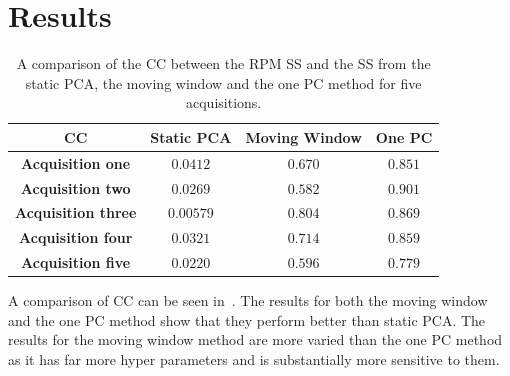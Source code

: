 \section{Results} \label{sec:results}
    \begin{table}
        \vspace{-0.5cm}
        \centering
        \captionsetup{singlelinecheck=false, justification=centering}
        \caption{A comparison of the \gls{CC} between the \gls{RPM} \gls{SS} and the \gls{SS} from the static \gls{PCA}, the moving window and the one \gls{PC} method for five acquisitions.}
        
        \resizebox*{1.0\linewidth}{!}
        {
            \begin{tabular}{||c|ccc||}
                \hline
                \textbf{\gls{CC}} & \textbf{Static \gls{PCA}} & \textbf{Moving Window} & \textbf{One \gls{PC}} \\
                \hline
                \textbf{Acquisition one}    & $0.0412$  & $0.670$ & $0.851$ \\
                \textbf{Acquisition two}    & $0.0269$  & $0.582$ & $0.901$ \\
                \textbf{Acquisition three}  & $0.00579$ & $0.804$ & $0.869$ \\
                \textbf{Acquisition four}   & $0.0321$  & $0.714$ & $0.859$ \\
                \textbf{Acquisition five}   & $0.0220$  & $0.596$ & $0.779$ \\
                \hline
            \end{tabular}
        }
        \label{tab:cross_correlation}
        \vspace{-0.0cm}
    \end{table}
    
    A comparison of \gls{CC} can be seen in~. The results for both the moving window and the one \gls{PC} method show that they perform better than static \gls{PCA}. The results for the moving window method are more varied than the one \gls{PC} method as it has far more hyper parameters and is substantially more sensitive to them.
    
